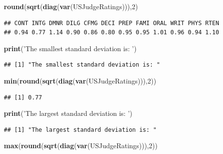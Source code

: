 \documentclass[]{article}
\newenvironment{Shaded}{\begin{snugshade}}{\end{snugshade}}
\newcommand{\DecValTok}[1]{\textcolor[rgb]{0.00,0.00,0.81}{#1}}
\newcommand{\KeywordTok}[1]{\textcolor[rgb]{0.13,0.29,0.53}{\textbf{#1}}}
\newcommand{\NormalTok}[1]{#1}
\newcommand{\StringTok}[1]{\textcolor[rgb]{0.31,0.60,0.02}{#1}}
\begin{document}
\begin{Shaded}
\begin{Highlighting}[]
\KeywordTok{round}\NormalTok{(}\KeywordTok{sqrt}\NormalTok{(}\KeywordTok{diag}\NormalTok{(}\KeywordTok{var}\NormalTok{(USJudgeRatings))),}\DecValTok{2}\NormalTok{)}
\end{Highlighting}
\end{Shaded}

\begin{verbatim}
## CONT INTG DMNR DILG CFMG DECI PREP FAMI ORAL WRIT PHYS RTEN 
## 0.94 0.77 1.14 0.90 0.86 0.80 0.95 0.95 1.01 0.96 0.94 1.10
\end{verbatim}

\begin{Shaded}
\begin{Highlighting}[]
\KeywordTok{print}\NormalTok{(}\StringTok{'The smallest standard deviation is: '}\NormalTok{)}
\end{Highlighting}
\end{Shaded}

\begin{verbatim}
## [1] "The smallest standard deviation is: "
\end{verbatim}

\begin{Shaded}
\begin{Highlighting}[]
\KeywordTok{min}\NormalTok{(}\KeywordTok{round}\NormalTok{(}\KeywordTok{sqrt}\NormalTok{(}\KeywordTok{diag}\NormalTok{(}\KeywordTok{var}\NormalTok{(USJudgeRatings))),}\DecValTok{2}\NormalTok{))}
\end{Highlighting}
\end{Shaded}

\begin{verbatim}
## [1] 0.77
\end{verbatim}

\begin{Shaded}
\begin{Highlighting}[]
\KeywordTok{print}\NormalTok{(}\StringTok{'The largest standard deviation is: '}\NormalTok{)}
\end{Highlighting}
\end{Shaded}

\begin{verbatim}
## [1] "The largest standard deviation is: "
\end{verbatim}

\begin{Shaded}
\begin{Highlighting}[]
\KeywordTok{max}\NormalTok{(}\KeywordTok{round}\NormalTok{(}\KeywordTok{sqrt}\NormalTok{(}\KeywordTok{diag}\NormalTok{(}\KeywordTok{var}\NormalTok{(USJudgeRatings))),}\DecValTok{2}\NormalTok{))}
\end{Highlighting}
\end{Shaded}
\end{document}
